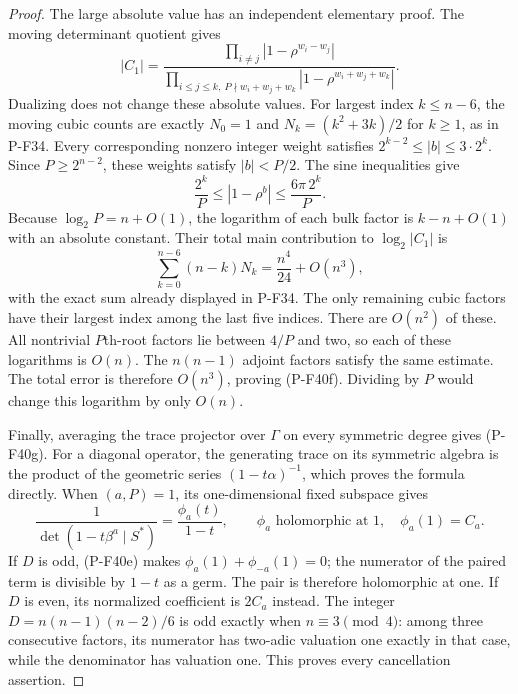 \documentclass[11pt,a4paper]{article}
\begin{document}
\begin{proof}
The large absolute value has an independent elementary
proof. The moving determinant quotient gives
\[
 |C_1|=
 \frac{\prod_{i\ne j}|1-\rho^{w_i-w_j}|}
 {\prod_{i\le j\le k,\ P\nmid w_i+w_j+w_k}
                    |1-\rho^{w_i+w_j+w_k}|}.
 \tag{P-F40j}
\]
Dualizing does not change these absolute values.
For largest index $k\le n-6$, the moving cubic counts
are exactly $N_0=1$ and $N_k=(k^2+3k)/2$ for $k\ge1$,
as in P-F34. Every corresponding nonzero integer weight
satisfies $2^{k-2}\le|b|\le3\cdot2^k$.
Since $P\ge2^{n-2}$, these weights satisfy $|b|<P/2$.
The sine inequalities give
\[
       \frac{2^k}{P}\le|1-\rho^b|
                   \le\frac{6\pi\,2^k}{P}.
\]
Because $\log_2P=n+O(1)$, the logarithm of each bulk
factor is $k-n+O(1)$ with an absolute constant.
Their total main contribution to $\log_2|C_1|$ is
\[
 \sum_{k=0}^{n-6}(n-k)N_k=\frac{n^4}{24}+O(n^3),
\]
with the exact sum already displayed in P-F34.
The only remaining cubic factors have their largest
index among the last five indices. There are $O(n^2)$
of these. All nontrivial $P$th-root factors lie between
$4/P$ and two, so each of these logarithms is $O(n)$.
The $n(n-1)$ adjoint factors satisfy the same estimate.
The total error is therefore $O(n^3)$, proving (P-F40f).
Dividing by $P$ would change this logarithm by only $O(n)$.

Finally, averaging the trace projector over $\Gamma$ on
every symmetric degree gives (P-F40g). For a diagonal
operator, the generating trace on its symmetric algebra
is the product of the geometric series
$(1-t\alpha)^{-1}$, which proves the formula directly.
When $(a,P)=1$, its one-dimensional fixed subspace gives
\[
 \frac1{\det(1-t\beta^a\mid S^*)}
       =\frac{\phi_a(t)}{1-t},\qquad
 \phi_a\text{ holomorphic at }1,\quad\phi_a(1)=C_a.
\]
If $D$ is odd, (P-F40e) makes
$\phi_a(1)+\phi_{-a}(1)=0$; the numerator of the paired
term is divisible by $1-t$ as a germ. The pair is
therefore holomorphic at one. If $D$ is even, its
normalized coefficient is $2C_a$ instead.
The integer $D=n(n-1)(n-2)/6$ is odd exactly when
$n\equiv3\pmod4$: among three consecutive factors,
its numerator has two-adic valuation one exactly
in that case, while the denominator has valuation one.
This proves every cancellation assertion.


\end{proof}
\end{document}
